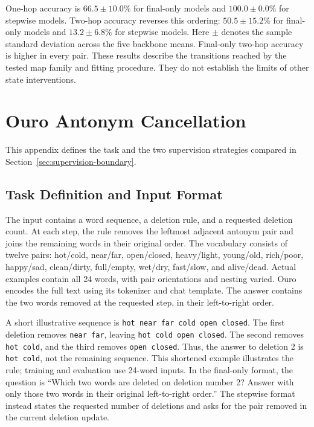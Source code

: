 \documentclass{article}
\begin{document}
\FloatBarrier
One-hop accuracy is $66.5\pm10.0\%$ for final-only models and $100.0\pm0.0\%$ for stepwise models. Two-hop accuracy reverses this ordering: $50.5\pm15.2\%$ for final-only models and $13.2\pm6.8\%$ for stepwise models. Here $\pm$ denotes the sample standard deviation across the five backbone means. Final-only two-hop accuracy is higher in every pair. These results describe the transitions reached by the tested map family and fitting procedure. They do not establish the limits of other state interventions.

\FloatBarrier
\section{Ouro Antonym Cancellation}
\label{app:supervision}
This appendix defines the task and the two supervision strategies compared in Section~\ref{sec:supervision-boundary}.

\subsection{Task Definition and Input Format}

The input contains a word sequence, a deletion rule, and a requested deletion count. At each step, the rule removes the leftmost adjacent antonym pair and joins the remaining words in their original order. The vocabulary consists of twelve pairs: hot/cold, near/far, open/closed, heavy/light, young/old, rich/poor, happy/sad, clean/dirty, full/empty, wet/dry, fast/slow, and alive/dead. Actual examples contain all 24 words, with pair orientations and nesting varied. Ouro encodes the full text using its tokenizer and chat template. The answer contains the two words removed at the requested step, in their left-to-right order.

A short illustrative sequence is \texttt{hot near far cold open closed}. The first deletion removes \texttt{near far}, leaving \texttt{hot cold open closed}. The second removes \texttt{hot cold}, and the third removes \texttt{open closed}. Thus, the answer to deletion 2 is \texttt{hot cold}, not the remaining sequence. This shortened example illustrates the rule; training and evaluation use 24-word inputs. In the final-only format, the question is ``Which two words are deleted on deletion number 2? Answer with only those two words in their original left-to-right order.'' The stepwise format instead states the requested number of deletions and asks for the pair removed in the current deletion update.
\end{document}
